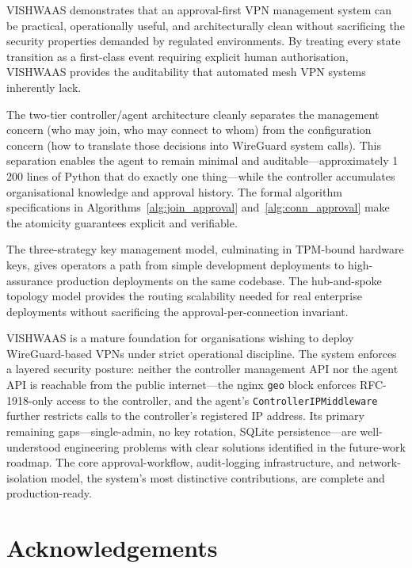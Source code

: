 \documentclass[conference]{IEEEtran}
\begin{document}
VISHWAAS demonstrates that an approval-first VPN management system can be
practical, operationally useful, and architecturally clean without sacrificing the
security properties demanded by regulated environments. By treating every state
transition as a first-class event requiring explicit human authorisation, VISHWAAS
provides the auditability that automated mesh VPN systems inherently lack.

The two-tier controller/agent architecture cleanly separates the management concern
(who may join, who may connect to whom) from the configuration concern (how to
translate those decisions into WireGuard system calls). This separation enables the
agent to remain minimal and auditable---approximately 1\,200 lines of Python that
do exactly one thing---while the controller accumulates organisational knowledge
and approval history. The formal algorithm specifications in
Algorithms~\ref{alg:join_approval} and~\ref{alg:conn_approval} make the atomicity
guarantees explicit and verifiable.

The three-strategy key management model, culminating in TPM-bound hardware keys,
gives operators a path from simple development deployments to high-assurance
production deployments on the same codebase. The hub-and-spoke topology model
provides the routing scalability needed for real enterprise deployments without
sacrificing the approval-per-connection invariant.

VISHWAAS is a mature foundation for organisations wishing to deploy WireGuard-based
VPNs under strict operational discipline. The system enforces a layered security
posture: neither the controller management API nor the agent API is reachable from
the public internet---the nginx \texttt{geo} block enforces RFC-1918-only access to
the controller, and the agent's \texttt{ControllerIPMiddleware} further restricts
calls to the controller's registered IP address. Its primary remaining gaps---single-admin,
no key rotation, SQLite persistence---are well-understood engineering problems with
clear solutions identified in the future-work roadmap. The core approval-workflow,
audit-logging infrastructure, and network-isolation model, the system's most
distinctive contributions, are complete and production-ready.

\section*{Acknowledgements}
\end{document}
